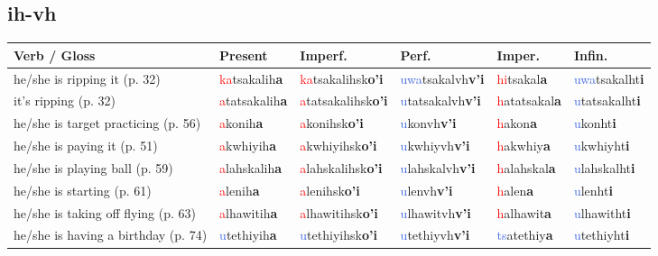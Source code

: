 \documentclass[oneside,openany]{book}%
\begin{document}
\subsection*{ih-vh}%
\begin{tabularx}{\textwidth}{>{\hsize=1.5\hsize\RaggedRight}X >{\hsize=0.9\hsize}X >{\hsize=0.9\hsize}X >{\hsize=0.9\hsize}X >{\hsize=0.9\hsize}X >{\hsize=0.9\hsize}X}%
\toprule%
\textbf{Verb / Gloss}&\textbf{Present}&\textbf{Imperf.}&\textbf{Perf.}&\textbf{Imper.}&\textbf{Infin.}\\%
\midrule%
he/she is ripping it (p. 32)&\textcolor{Red}{ka}tsakalih\textbf{a}&\textcolor{Red}{ka}tsakalihsk\textbf{o'i}&\textcolor{RoyalBlue}{uwa}tsakalvh\textbf{v'i}&\textcolor{Red}{hi}tsakal\textbf{a}&\textcolor{RoyalBlue}{uwa}tsakalht\textbf{i}\\%
it's ripping (p. 32)&\textcolor{Red}{a}tatsakalih\textbf{a}&\textcolor{Red}{a}tatsakalihsk\textbf{o'i}&\textcolor{RoyalBlue}{u}tatsakalvh\textbf{v'i}&\textcolor{Red}{h}atatsakal\textbf{a}&\textcolor{RoyalBlue}{u}tatsakalht\textbf{i}\\%
he/she is target practicing (p. 56)&\textcolor{Red}{a}konih\textbf{a}&\textcolor{Red}{a}konihsk\textbf{o'i}&\textcolor{RoyalBlue}{u}konvh\textbf{v'i}&\textcolor{Red}{h}akon\textbf{a}&\textcolor{RoyalBlue}{u}konht\textbf{i}\\%
he/she is paying it (p. 51)&\textcolor{Red}{a}kwhiyih\textbf{a}&\textcolor{Red}{a}kwhiyihsk\textbf{o'i}&\textcolor{RoyalBlue}{u}kwhiyvh\textbf{v'i}&\textcolor{Red}{h}akwhiy\textbf{a}&\textcolor{RoyalBlue}{u}kwhiyht\textbf{i}\\%
he/she is playing ball (p. 59)&\textcolor{Red}{a}lahskalih\textbf{a}&\textcolor{Red}{a}lahskalihsk\textbf{o'i}&\textcolor{RoyalBlue}{u}lahskalvh\textbf{v'i}&\textcolor{Red}{h}alahskal\textbf{a}&\textcolor{RoyalBlue}{u}lahskalht\textbf{i}\\%
he/she is starting (p. 61)&\textcolor{Red}{a}lenih\textbf{a}&\textcolor{Red}{a}lenihsk\textbf{o'i}&\textcolor{RoyalBlue}{u}lenvh\textbf{v'i}&\textcolor{Red}{h}alen\textbf{a}&\textcolor{RoyalBlue}{u}lenht\textbf{i}\\%
he/she is taking off flying (p. 63)&\textcolor{Red}{a}lhawitih\textbf{a}&\textcolor{Red}{a}lhawitihsk\textbf{o'i}&\textcolor{RoyalBlue}{u}lhawitvh\textbf{v'i}&\textcolor{Red}{h}alhawit\textbf{a}&\textcolor{RoyalBlue}{u}lhawitht\textbf{i}\\%
he/she is having a birthday (p. 74)&\textcolor{RoyalBlue}{u}tethiyih\textbf{a}&\textcolor{RoyalBlue}{u}tethiyihsk\textbf{o'i}&\textcolor{RoyalBlue}{u}tethiyvh\textbf{v'i}&\textcolor{RoyalBlue}{ts}atethiy\textbf{a}&\textcolor{RoyalBlue}{u}tethiyht\textbf{i}\\%

\end{tabularx}
\end{document}
